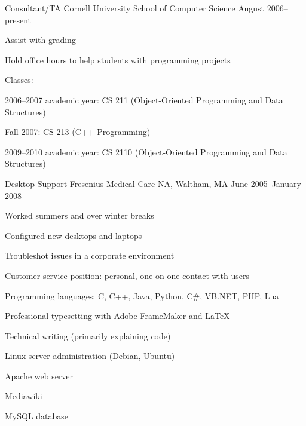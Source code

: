 \documentclass{res}
\begin{document}
\begin{resume}
\affiliation
	{Consultant/TA}
	{Cornell University School of Computer Science}
	{August 2006--present}
	\begin{pos}
	\item Assist with grading
	\item Hold office hours to help students with programming
	projects
	\item Classes:
		\begin{compactitem}
		\item 2006--2007 academic year: CS 211 (Object-Oriented Programming and Data
		Structures)
		\item Fall 2007: CS 213 (C++ Programming)
		\item 2009--2010 academic year: CS 2110 (Object-Oriented Programming and
		Data Structures)
		\end{compactitem}
	\end{pos}

\affiliation
	{Desktop Support}
	{Fresenius Medical Care NA, Waltham, MA}
	{June 2005--January 2008}
	\begin{pos}
	\item Worked summers and over winter breaks
	\item Configured new desktops and laptops
	\item Troubleshot issues in a corporate environment
	\item Customer service position: personal, one-on-one contact with users
	\end{pos}

	\vspace{10pt}
	\begin{compactitem}
	\item Programming languages: C, C++, Java, Python, C\#, VB.NET, PHP, Lua
	\item Professional typesetting with Adobe FrameMaker and \LaTeX{}
	\item Technical writing (primarily explaining code)
	\item Linux server administration (Debian, Ubuntu)
		\begin{compactitem}
		\item Apache web server
		\item Mediawiki
		\item MySQL database
		\end{compactitem}
	\end{compactitem}

\end{resume}
\end{document}
